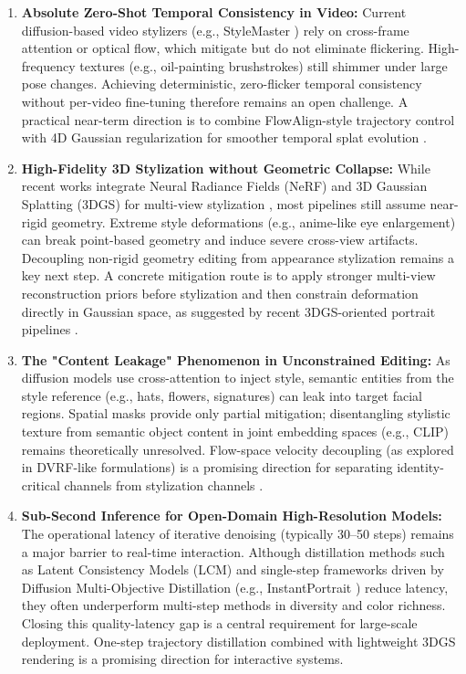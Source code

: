 \documentclass[journal]{IEEEtran}
\begin{document}
\begin{enumerate}
\item \textbf{Absolute Zero-Shot Temporal Consistency in Video:}
Current diffusion-based video stylizers (e.g., StyleMaster \cite{ye2024stylemastersy}) rely on cross-frame attention or optical flow, which mitigate but do not eliminate flickering. High-frequency textures (e.g., oil-painting brushstrokes) still shimmer under large pose changes. Achieving deterministic, zero-flicker temporal consistency without per-video fine-tuning therefore remains an open challenge.
A practical near-term direction is to combine FlowAlign-style trajectory control with 4D Gaussian regularization for smoother temporal splat evolution \cite{flowalign2025}.

\item \textbf{High-Fidelity 3D Stylization without Geometric Collapse:}
While recent works integrate Neural Radiance Fields (NeRF) and 3D Gaussian Splatting (3DGS) for multi-view stylization \cite{jain2024stylesplat,feng20233dfs}, most pipelines still assume near-rigid geometry. Extreme style deformations (e.g., anime-like eye enlargement) can break point-based geometry and induce severe cross-view artifacts. Decoupling non-rigid geometry editing from appearance stylization remains a key next step.
A concrete mitigation route is to apply stronger multi-view reconstruction priors before stylization and then constrain deformation directly in Gaussian space, as suggested by recent 3DGS-oriented portrait pipelines \cite{threedtoonify2024,jain2024stylesplat}.

\item \textbf{The "Content Leakage" Phenomenon in Unconstrained Editing:}
As diffusion models use cross-attention to inject style, semantic entities from the style reference (e.g., hats, flowers, signatures) can leak into target facial regions. Spatial masks provide only partial mitigation; disentangling stylistic texture from semantic object content in joint embedding spaces (e.g., CLIP) remains theoretically unresolved.
Flow-space velocity decoupling (as explored in DVRF-like formulations) is a promising direction for separating identity-critical channels from stylization channels \cite{dvrf2025}.

\item \textbf{Sub-Second Inference for Open-Domain High-Resolution Models:}
The operational latency of iterative denoising (typically 30--50 steps) remains a major barrier to real-time interaction. Although distillation methods such as Latent Consistency Models (LCM) and single-step frameworks driven by Diffusion Multi-Objective Distillation (e.g., InstantPortrait \cite{lai2025instantportraitop}) reduce latency, they often underperform multi-step methods in diversity and color richness. Closing this quality-latency gap is a central requirement for large-scale deployment.
One-step trajectory distillation combined with lightweight 3DGS rendering is a promising direction for interactive systems.
\end{enumerate}
\end{document}
